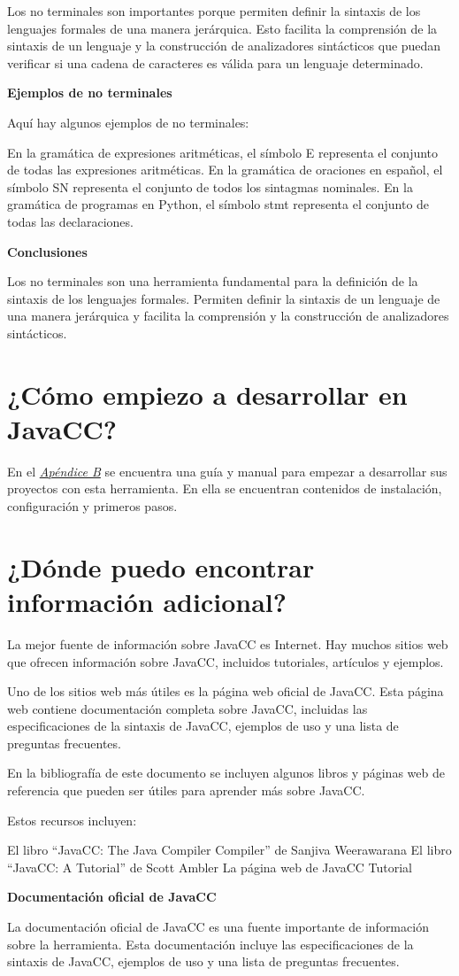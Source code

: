 Los no terminales son importantes porque permiten definir la sintaxis de los lenguajes formales de una manera jerárquica. Esto facilita la comprensión de la sintaxis de un lenguaje y la construcción de analizadores sintácticos que puedan verificar si una cadena de caracteres es válida para un lenguaje determinado.

\textbf{Ejemplos de no terminales}

Aquí hay algunos ejemplos de no terminales:

    En la gramática de expresiones aritméticas, el símbolo E representa el conjunto de todas las expresiones aritméticas.
    En la gramática de oraciones en español, el símbolo SN representa el conjunto de todos los sintagmas nominales.
    En la gramática de programas en Python, el símbolo stmt representa el conjunto de todas las declaraciones.

\textbf{Conclusiones}

Los no terminales son una herramienta fundamental para la definición de la sintaxis de los lenguajes formales. Permiten definir la sintaxis de un lenguaje de una manera jerárquica y facilita la comprensión y la construcción de analizadores sintácticos.

\section{¿Cómo empiezo a desarrollar en JavaCC?}

\noindent En el \hyperref[sec:instalaciondejavacc]{\textit{Apéndice B}} se encuentra una guía y manual para empezar a desarrollar sus proyectos con esta herramienta. En ella se encuentran contenidos de instalación, configuración y primeros pasos.


\section{¿Dónde puedo encontrar información adicional?}

\noindent La mejor fuente de información sobre JavaCC es Internet. Hay muchos sitios web que ofrecen información sobre JavaCC, incluidos tutoriales, artículos y ejemplos.

Uno de los sitios web más útiles es la página web oficial de JavaCC. Esta página web contiene documentación completa sobre JavaCC, incluidas las especificaciones de la sintaxis de JavaCC, ejemplos de uso y una lista de preguntas frecuentes.

En la bibliografía de este documento se incluyen algunos libros y páginas web de referencia que pueden ser útiles para aprender más sobre JavaCC.

Estos recursos incluyen:

    El libro ``JavaCC: The Java Compiler Compiler'' de Sanjiva Weerawarana
    El libro ``JavaCC: A Tutorial'' de Scott Ambler
    La página web de JavaCC Tutorial

\textbf{Documentación oficial de JavaCC}

La documentación oficial de JavaCC es una fuente importante de información sobre la herramienta. Esta documentación incluye las especificaciones de la sintaxis de JavaCC, ejemplos de uso y una lista de preguntas frecuentes.
